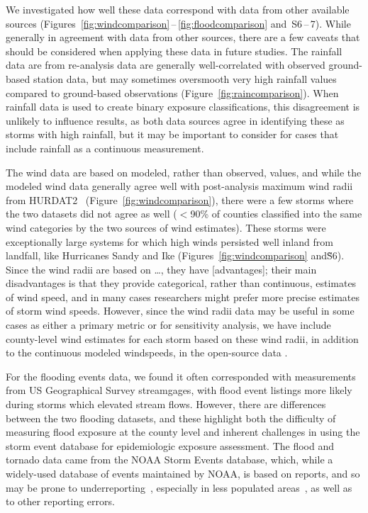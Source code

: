 We investigated how well these data correspond with data from other available
sources (Figures~\ref{fig:windcomparison}\,--\,\ref{fig:floodcomparison}
and~S6\,--\,7). While generally in agreement with data from other sources,
there are a few caveats that should be considered when applying these data in
future studies. The rainfall data are from re-analysis data are generally
well-correlated with observed ground-based station data, but may sometimes
oversmooth very high rainfall values compared to ground-based observations
(Figure~\ref{fig:raincomparison}). When rainfall data is used to create binary
exposure classifications, this disagreement is unlikely to influence results,
as both data sources agree in identifying these as storms with high rainfall,
but it may be important to consider for cases that include rainfall as a
continuous measurement. 

The wind data are based on modeled, rather than observed, values, and while the
modeled wind data generally agree well with post-analysis maximum wind radii
from \ac{HURDAT2}~\parencite{landsea2013} (Figure~\ref{fig:windcomparison}),
there were a few storms where the two datasets did not agree as well ($<$90\%
of counties classified into the same wind categories by the two sources of wind
estimates). These storms were exceptionally large systems for which high winds
persisted well inland from landfall, like Hurricanes Sandy and Ike
(Figures~\ref{fig:windcomparison} and\~S6). Since the wind radii are based on
\ldots, they have [advantages]; their main disadvantages is that they provide
categorical, rather than continuous, estimates of wind speed, and in many cases
researchers might prefer more precise estimates of storm wind speeds. However,
since the wind radii data may be useful in some cases as either a primary
metric or for sensitivity analysis, we have include county-level wind estimates
for each storm based on these wind radii, in addition to the continuous modeled
windspeeds, in the open-source data \cite{hurricaneexposuredata}.

For the flooding events data, we found it often corresponded with measurements
from \ac{US} Geographical Survey streamgages, with flood event listings more
likely during storms which elevated stream flows. However, there are
differences between the two flooding datasets, and these highlight both the
difficulty of measuring flood exposure at the county level and inherent
challenges in using the storm event database for epidemiologic exposure
assessment.  The flood and tornado data came from the \ac{NOAA} Storm Events
database, which, while a widely-used database of events maintained by
\ac{NOAA}, is based on reports, and so may be prone to
underreporting~\parencite{Ashley2008flood, Curran2000}, especially in less
populated areas~\parencite{Witt1998, Ashley2007}, as well as to other reporting
errors. 

